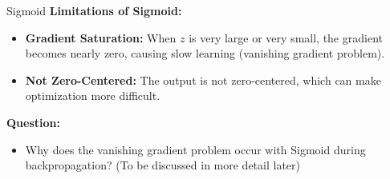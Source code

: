 \documentclass[serif, aspectratio=169]{beamer}
\begin{document}
\begin{frame}{Sigmoid}
    \textbf{Limitations of Sigmoid:}
    \begin{itemize}
        \item \textbf{Gradient Saturation:} When \( z \) is very large or very small, the gradient becomes nearly zero, causing slow learning (vanishing gradient problem).
        \item \textbf{Not Zero-Centered:} The output is not zero-centered, which can make optimization more difficult.
    \end{itemize}

    \textbf{Question:}
    \begin{itemize}
        \item Why does the vanishing gradient problem occur with Sigmoid during backpropagation? (To be discussed in more detail later)
    \end{itemize}
\end{frame}
\end{document}
